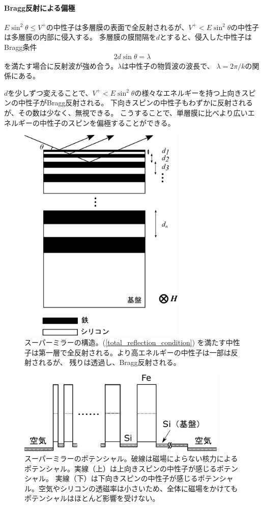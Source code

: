 \paragraph{Bragg反射による偏極}
$E\sin^2\theta\leq V^+$の中性子は多層膜の表面で全反射されるが、$V^+<E\sin^2\theta$の中性子は多層膜の内部に侵入する。
多層膜の膜間隔を$d$とすると、侵入した中性子はBragg条件
\begin{align}
2d\sin\theta=\lambda
\end{align}
を満たす場合に反射波が強め合う。$\lambda$は中性子の物質波の波長で、
$\lambda=2\pi/k$の関係にある。

$d$を少しずつ変えることで、$V^+<E\sin^2\theta$の様々なエネルギーを持つ上向きスピンの中性子がBragg反射される。
下向きスピンの中性子もわずかに反射されるが、その数は少なく、無視できる。
こうすることで、単層膜に比べより広いエネルギーの中性子のスピンを偏極することができる。

\begin{figure}[H]
\centering
\includegraphics[width=8cm]{mirror/super_mirror.pdf}
\caption{スーパーミラーの構造。(\ref{total_reflection_condition})
を満たす中性子は第一層で全反射される。より高エネルギーの中性子は一部は反射されるが、
残りは透過し、Bragg反射される。\label{mirror_super_mirror}}
\end{figure}
\begin{figure}[h]
\centering
\includegraphics[width=10cm]{mirror/super_mirror_potential.pdf}
\caption{スーパーミラーのポテンシャル。破線は磁場によらない核力によるポテンシャル。実線（上）は上向きスピンの中性子が感じるポテンシャル。
実線（下）は下向きスピンの中性子が感じるポテンシャル。空気やシリコンの透磁率は小さいため、全体に磁場をかけても
ポテンシャルはほとんど影響を受けない。}
\end{figure}